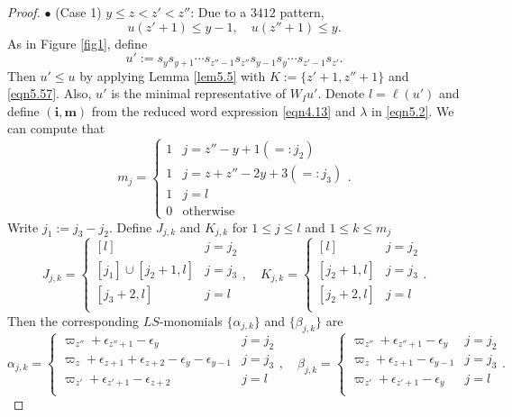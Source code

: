 \documentclass[12pt]{amsart}
\theoremstyle{definition}
\theoremstyle{remark}
\begin{document}
\begin{proof}
$\bullet$ (Case 1) $y\leq z < z' <z''$: Due to a $3412$ pattern,
\begin{equation}\label{eqn5.57}
u(z'+1) \leq y-1, \quad u(z''+1) \leq y.
\end{equation}
As in Figure \ref{fig1}, define
\begin{equation}\label{eqn4.13}
u':=s_y s_{y+1} \cdots s_{z''-1}s_{z''} s_{y-1} s_{y} \cdots s_{z'-1}s_{z'}.
\end{equation}
Then $u' \leq u$ by applying Lemma \ref{lem5.5} with $K := \{ z'+1 , z''+1\}$ and \eqref{eqn5.57}. Also, $u'$ is the minimal representative of $W_I u'$. Denote $l = \ell (u')$ and define $(\mathbf{i}, \mathbf{m} )$ from the reduced word expression \eqref{eqn4.13} and $\lambda$ in \eqref{eqn5.2}. We can compute that
\begin{equation}\label{eqn4.14}
m_j = 
\begin{cases}
1 & j = z''-y+1 (=: j_2) \\
1 & j = z+z''-2y + 3 (=:j_3)\\
1 & j = l\\
0 & \text{otherwise}
\end{cases}
.
\end{equation}
Write $j_1:= j_3-j_2$. Define $J_{j,k}$ and $K_{j,k}$ for $1 \leq j \leq l$ and $1 \leq k \leq m_j$
\begin{equation}\label{eqn4.15}
J_{j,k}=
\begin{cases}
[l] & j = j_2 \\
[j_1]\cup [j_2 +1 , l]& j=  j_3 \\
[j_3 +2 , l] & j=l\\
\end{cases}
,
\quad
K_{j,k}=
\begin{cases}
[l] & j=j_2 \\
[j_2 + 1 , l] & j = j_3\\
[j_2 + 2,l] & j = l \\
\end{cases}
.
\end{equation}
Then the corresponding $LS$-monomials $\{\alpha_{j,k}\}$ and $\{\beta_{j,k}\}$ are
\begin{equation}\label{eqn4.17}
\alpha_{j,k} = 
\begin{cases}
\varpi_{z''} +\epsilon_{z''+1} - \epsilon_y & j = j_2 \\
\varpi_{z} + \epsilon_{z +1} + \epsilon_{z +2} - \epsilon_{y}-\epsilon_{y-1} & j = j_3 \\
\varpi_{z'} + \epsilon_{z'+1} - \epsilon_{z +2}  & j= l \\
\end{cases}
, \quad \beta_{j,k} = 
\begin{cases}
\varpi_{z''} +\epsilon_{z''+1} - \epsilon_y & j = j_2 \\
\varpi_{z} + \epsilon_{z +1}  -\epsilon_{y-1} & j = j_3 \\
\varpi_{z'} + \epsilon_{z'+1} - \epsilon_{y}  & j= l \\
\end{cases}
.
\end{equation}


\end{proof}
\end{document}
